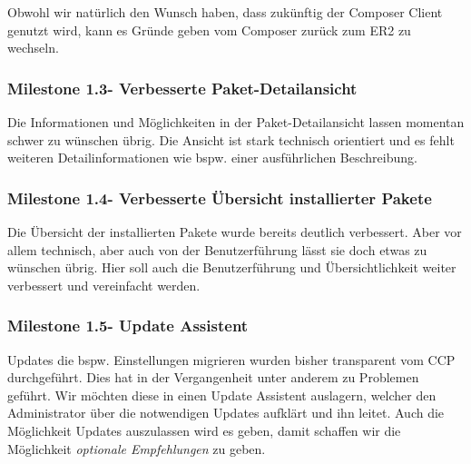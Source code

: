 \documentclass[
paper=a4,
draft=false,%
fontsize=10pt%
]{scrartcl}
\begin{document}

Obwohl wir natürlich den Wunsch haben, dass zukünftig der Composer Client genutzt wird, kann es Gründe geben vom Composer zurück zum ER2 zu wechseln.

\subsubsection{Milestone 1.3\footnotemark - Verbesserte Paket-Detailansicht}


Die Informationen und Möglichkeiten in der Paket-Detailansicht lassen momentan schwer zu wünschen übrig. Die Ansicht ist stark technisch orientiert und es fehlt weiteren Detailinformationen wie bspw. einer ausführlichen Beschreibung.

\subsubsection{Milestone 1.4\footnotemark - Verbesserte Übersicht installierter Pakete}


Die Übersicht der installierten Pakete wurde bereits deutlich verbessert. Aber vor allem technisch, aber auch von der Benutzerführung lässt sie doch etwas zu wünschen übrig. Hier soll auch die Benutzerführung und Übersichtlichkeit weiter verbessert und vereinfacht werden.

\subsubsection{Milestone 1.5\footnotemark - Update Assistent}


Updates die bspw. Einstellungen migrieren wurden bisher transparent vom CCP durchgeführt. Dies hat in der Vergangenheit unter anderem zu Problemen geführt. Wir möchten diese in einen Update Assistent auslagern, welcher den Administrator über die notwendigen Updates aufklärt und ihn leitet. Auch die Möglichkeit Updates auszulassen wird es geben, damit schaffen wir die Möglichkeit \textit{optionale Empfehlungen} zu geben.
\end{document}
